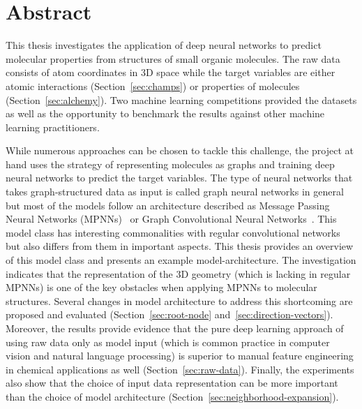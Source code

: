 %


%
%


\section*{\Huge{Abstract}}

\vspace{1cm}
\noindent This thesis investigates the application of deep neural networks to predict molecular properties from structures of small organic molecules. The raw data consists of atom coordinates in 3D space while the target variables are either atomic interactions (Section~\ref{sec:champs}) or properties of molecules (Section~\ref{sec:alchemy}). Two machine learning competitions provided the datasets as well as the opportunity to benchmark the results against other machine learning practitioners.

While numerous approaches can be chosen to tackle this challenge, the project at hand uses the strategy of representing molecules as graphs and training deep neural networks to predict the target variables. The type of neural networks that takes graph-structured data as input is called graph neural networks in general but most of the models follow an architecture described as Message Passing Neural Networks (MPNNs)~\cite{Gilmer2017} or Graph Convolutional Neural Networks~\cite{Schutt2017}. This model class has interesting commonalities with regular convolutional networks but also differs from them in important aspects. This thesis provides an overview of this model class and presents an example model-architecture. The investigation indicates that the representation of the 3D geometry (which is lacking in regular MPNNs) is one of the key obstacles when applying MPNNs to molecular structures. Several changes in model architecture to address this shortcoming are proposed and evaluated (Section~\ref{sec:root-node} and~\ref{sec:direction-vectors}). Moreover, the results provide evidence that the pure deep learning approach of using raw data only as model input (which is common practice in computer vision and natural language processing) is superior to manual feature engineering in chemical applications as well (Section~\ref{sec:raw-data}). Finally, the experiments also show that the choice of input data representation can be more important than the choice of model architecture (Section~\ref{sec:neighborhood-expansion}).

